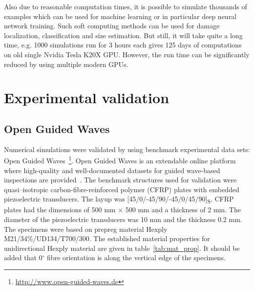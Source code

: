 \documentclass[12pt]{iopart}
\begin{document}
Also due to reasonable computation times, it is possible to simulate thousands of examples which can be used for machine learning or in particular deep neural network training. Such soft computing methods can be used for damage localization, classification and size estimation. But still, it will take quite a long time, e.g. 1000 simulations run for 3 hours each gives 125 days of computations on old single Nvidia Tesla K20X GPU. However, the run time can be significantly reduced by using multiple modern GPUs.

\section{Experimental validation}
\subsection{Open Guided Waves \label{sec:ogw}}
Numerical simulations were validated by using benchmark experimental data sets: Open Guided Waves~\footnote{\url{http://www.open-guided-waves.de}}. Open Guided Waves is an extendable online platform where high-quality and well-documented datasets for guided wave-based inspections are provided~\cite{Moll2018}. The benchmark structures used for validation were quasi--isotropic carbon-fibre-reinforced polymer (CFRP) plates with embedded piezoelectric transducers. The layup was [45/0/-45/90/-45/0/45/90]\textsubscript{S}. CFRP plates had the dimensions of 500 mm \(\times\) 500 mm and a thickness of 2 mm. The diameter of the piezoelectric transducers was 10 mm and the thickness 0.2 mm. The specimens were based on prepreg material Hexply\textsuperscript{\textregistered} M21/34\%/UD134/T700/300. The established material properties for unidirectional Hexply material are given in table~\ref{tab:mat_prop}. It should be added that 0\(^{\circ}\) fibre orientation is along the vertical edge of the specimens.
\end{document}
